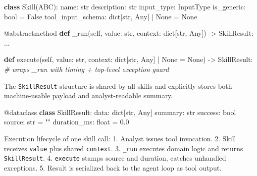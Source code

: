 \documentclass[
]{article}
\newenvironment{Shaded}{}{}
\newcommand{\AttributeTok}[1]{\textcolor[rgb]{0.49,0.56,0.16}{#1}}
\newcommand{\BuiltInTok}[1]{\textcolor[rgb]{0.00,0.50,0.00}{#1}}
\newcommand{\CommentTok}[1]{\textcolor[rgb]{0.38,0.63,0.69}{\textit{#1}}}
\newcommand{\FloatTok}[1]{\textcolor[rgb]{0.25,0.63,0.44}{#1}}
\newcommand{\KeywordTok}[1]{\textcolor[rgb]{0.00,0.44,0.13}{\textbf{#1}}}
\newcommand{\NormalTok}[1]{#1}
\newcommand{\OperatorTok}[1]{\textcolor[rgb]{0.40,0.40,0.40}{#1}}
\newcommand{\StringTok}[1]{\textcolor[rgb]{0.25,0.44,0.63}{#1}}
\newcommand{\VariableTok}[1]{\textcolor[rgb]{0.10,0.09,0.49}{#1}}
\begin{document}
\begin{Shaded}
\begin{Highlighting}[]
\KeywordTok{class}\NormalTok{ Skill(ABC):}
\NormalTok{    name: }\BuiltInTok{str}
\NormalTok{    description: }\BuiltInTok{str}
\NormalTok{    input\_type: InputType}
\NormalTok{    is\_generic: }\BuiltInTok{bool} \OperatorTok{=} \VariableTok{False}
\NormalTok{    tool\_input\_schema: }\BuiltInTok{dict}\NormalTok{[}\BuiltInTok{str}\NormalTok{, Any] }\OperatorTok{|} \VariableTok{None} \OperatorTok{=} \VariableTok{None}

    \AttributeTok{@abstractmethod}
    \KeywordTok{def}\NormalTok{ \_run(}\VariableTok{self}\NormalTok{, value: }\BuiltInTok{str}\NormalTok{, context: }\BuiltInTok{dict}\NormalTok{[}\BuiltInTok{str}\NormalTok{, Any]) }\OperatorTok{{-}\textgreater{}}\NormalTok{ SkillResult:}
\NormalTok{        ...}

    \KeywordTok{def}\NormalTok{ execute(}\VariableTok{self}\NormalTok{, value: }\BuiltInTok{str}\NormalTok{, context: }\BuiltInTok{dict}\NormalTok{[}\BuiltInTok{str}\NormalTok{, Any] }\OperatorTok{|} \VariableTok{None} \OperatorTok{=} \VariableTok{None}\NormalTok{) }\OperatorTok{{-}\textgreater{}}\NormalTok{ SkillResult:}
        \CommentTok{\# wraps \_run with timing + top{-}level exception guard}
\end{Highlighting}
\end{Shaded}

The \texttt{SkillResult} structure is shared by all skills and
explicitly stores both machine-usable payload and analyst-readable
summary.

\begin{Shaded}
\begin{Highlighting}[]
\AttributeTok{@dataclass}
\KeywordTok{class}\NormalTok{ SkillResult:}
\NormalTok{    data: }\BuiltInTok{dict}\NormalTok{[}\BuiltInTok{str}\NormalTok{, Any]}
\NormalTok{    summary: }\BuiltInTok{str}
\NormalTok{    success: }\BuiltInTok{bool}
\NormalTok{    source: }\BuiltInTok{str} \OperatorTok{=} \StringTok{""}
\NormalTok{    duration\_ms: }\BuiltInTok{float} \OperatorTok{=} \FloatTok{0.0}
\end{Highlighting}
\end{Shaded}

Execution lifecycle of one skill call: 1. Analyst issues tool
invocation. 2. Skill receives \texttt{value} plus shared
\texttt{context}. 3. \texttt{\_run} executes domain logic and returns
\texttt{SkillResult}. 4. \texttt{execute} stamps source and duration,
catches unhandled exceptions. 5. Result is serialized back to the agent
loop as tool output.
\end{document}
